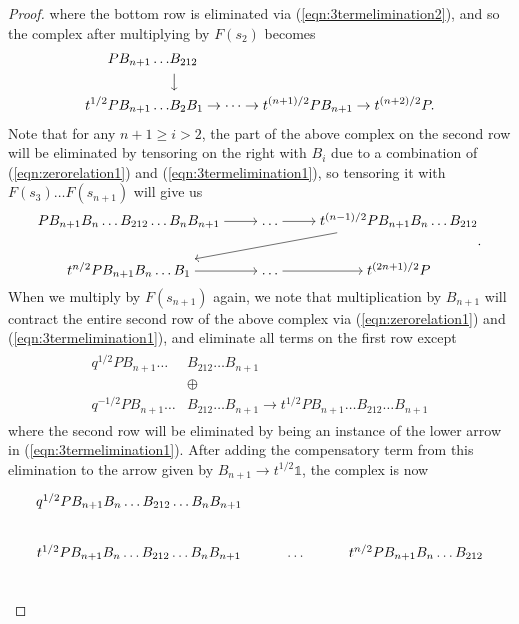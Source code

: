 \documentclass[11pt]{article}
\theoremstyle{definition}
\theoremstyle{remark}
\numberwithin{equation}{section}
\begin{document}
\begin{proof}
where the bottom row is eliminated via (\ref{eqn:3termelimination2}), and so
the complex after multiplying by $F(s_{2})$ becomes
\begin{align*}
	PB_{n+1}\dots &B_{212}\\
		      &{\big\downarrow}\\
	t^{1/2}PB_{n+1}\dots & B_{2}B_1
	\to \dots \to t^{(n+1)/2}PB_{n+1} \to t^{(n+2)/2}P.
\end{align*}
Note that for any $n+1 \geq i > 2$,
the part of the above complex on the second row will
be eliminated by tensoring on the right with $B_i$ due to a combination of
(\ref{eqn:zerorelation1}) and (\ref{eqn:3termelimination1}), so tensoring it
with $F(s_3)\dots F(s_{n+1})$ will give us
\begin{equation}
\label{eqn:secondquarter}
\begin{tikzcd}[ampersand replacement=\&,cramped]
	{PB_{n+1}B_n\dots B_{212}\dots B_{n}B_{n+1}} \& \dots \& {t^{(n-1)/2}PB_{n+1}B_n\dots B_{212}} \\
	{t^{n/2}PB_{n+1}B_n\dots B_1} \& \dots \& {t^{(2n+1)/2}P}
	\arrow[from=1-1, to=1-2]
	\arrow[from=1-2, to=1-3]
	\arrow[from=1-3, to=2-1]
	\arrow[from=2-1, to=2-2]
	\arrow[from=2-2, to=2-3]
\end{tikzcd}.
\end{equation}
When we multiply by $F(s_{n+1})$ again, we note that multiplication by
$B_{n+1}$ will contract the entire second row of the above complex via
(\ref{eqn:zerorelation1}) and (\ref{eqn:3termelimination1}), and eliminate all
terms on the first row except
\begin{align*}
	\begin{split}
		q^{1/2}PB_{n+1}\dots &B_{212} \dots B_{n+1}\\
		&\oplus\\
		q^{-1/2}PB_{n+1}\dots &B_{212}\dots B_{n+1} \to t^{1/2}
		PB_{n+1}\dots B_{212} \dots B_{n+1}
	\end{split}
\end{align*}
where the second row will be eliminated by being an instance of the lower arrow
in (\ref{eqn:3termelimination1}). After adding the compensatory term from this
elimination to the arrow given by $B_{n+1}\to t^{1/2}\mathbb{1}$, the complex
is now
\[
\begin{tikzcd}[ampersand replacement=\&]
	{q^{1/2}PB_{n+1}B_n\dots B_{212}\dots B_{n}B_{n+1}} \&\& \\
	{t^{1/2}PB_{n+1}B_n\dots B_{212}\dots B_{n}B_{n+1}} \& \dots \& {t^{n/2}PB_{n+1}B_n\dots B_{212}} \\

\end{tikzcd}\]
\end{proof}
\end{document}
